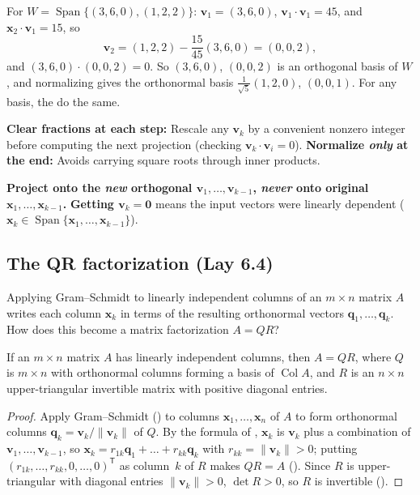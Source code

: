 \documentclass[10pt]{scrartcl}
\newcommand{\vv}[1]{\mathbf{#1}}
\DeclareMathOperator{\spn}{Span}\DeclareMathOperator{\Nul}{Nul}\DeclareMathOperator{\Col}{Col}\DeclareMathOperator{\Row}{Row}\DeclareMathOperator{\tr}{tr}\DeclareMathOperator{\proj}{proj}\DeclareMathOperator{\dist}{dist}
\begin{document}
\revisit For $W=\spn\{(3,6,0),(1,2,2)\}$: $\vv v_1=(3,6,0)$, $\vv v_1\cdot\vv v_1=45$, and $\vv x_2\cdot\vv v_1=15$, so
\[
  \vv v_2=(1,2,2)-\frac{15}{45}(3,6,0)=(0,0,2),
\]
and $(3,6,0)\cdot(0,0,2)=0$. So $(3,6,0)$, $(0,0,2)$ is an orthogonal basis of $W$, and normalizing gives the orthonormal basis $\frac{1}{\sqrt5}(1,2,0)$, $(0,0,1)$. For any basis, the  do the same.

\begin{shortcuts}
  \ii \textbf{Clear fractions at each step:} Rescale any $\vv v_k$ by a convenient nonzero integer before computing the next projection (checking $\vv v_k\cdot\vv v_i=0$).
  \ii \textbf{Normalize \emph{only} at the end:} Avoids carrying square roots through inner products.
\end{shortcuts}

\begin{trapbox}
  \ii \textbf{Project onto the \emph{new} orthogonal $\vv v_1,\dots,\vv v_{k-1}$, \emph{never} onto original $\vv x_1,\dots,\vv x_{k-1}$.}
  \ii \textbf{Getting $\vv v_k=\vv 0$} means the input vectors were linearly dependent ($\vv x_k\in\spn\{\vv x_1,\dots,\vv x_{k-1}\}$).
\end{trapbox}

\subsection{The QR factorization (Lay 6.4)}

\begin{qbox}
  Applying Gram--Schmidt to linearly independent columns of an $m\times n$ matrix $A$ writes each column $\vv x_k$ in terms of the resulting orthonormal vectors $\vv q_1,\dots,\vv q_k$. How does this become a matrix factorization $A=QR$?
\end{qbox}

\begin{theorem*}
  If an $m\times n$ matrix $A$ has linearly independent columns, then $A=QR$, where $Q$ is $m\times n$ with orthonormal columns forming a basis of $\Col A$, and $R$ is an $n\times n$ upper-triangular invertible matrix with positive diagonal entries.
\end{theorem*}
\begin{proof}
  Apply Gram--Schmidt () to columns $\vv x_1,\dots,\vv x_n$ of $A$ to form orthonormal columns $\vv q_k=\vv v_k/\|\vv v_k\|$ of $Q$. By the formula of , $\vv x_k$ is $\vv v_k$ plus a combination of $\vv v_1,\dots,\vv v_{k-1}$, so $\vv x_k=r_{1k}\vv q_1+\dots+r_{kk}\vv q_k$ with $r_{kk}=\|\vv v_k\|>0$; putting $(r_{1k},\dots,r_{kk},0,\dots,0)^{\mathsf T}$ as column~$k$ of $R$ makes $QR=A$ (). Since $R$ is upper-triangular with diagonal entries $\|\vv v_k\|>0$, $\det R>0$, so $R$ is invertible ().
\end{proof}
\end{document}
